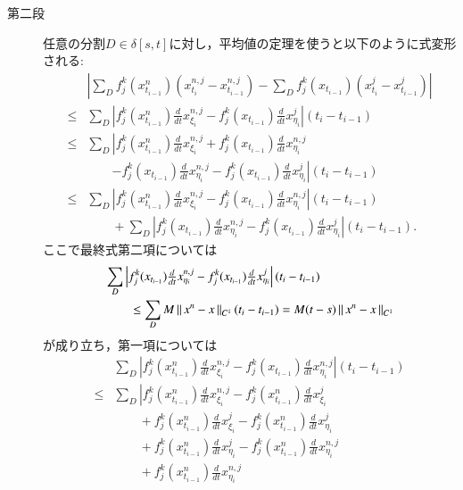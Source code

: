 \begin{prf}
\begin{description}
		\item[第二段]
			任意の分割$D \in \delta[s,t]$に対し，平均値の定理を使うと以下のように式変形される:
			\begin{align}
				&\left| \sum_D f^k_j(x^n_{t_{i-1}})(x^{n,j}_{t_i} - x^{n,j}_{t_{i-1}})
					- \sum_D f^k_j(x_{t_{i-1}})(x^j_{t_i} - x^j_{t_{i-1}}) \right| \\
				\leq &\sum_D \left| f^k_j(x^n_{t_{i-1}}) \tfrac{d}{dt}x^{n,j}_{\xi_i} 
					- f^k_j(x_{t_{i-1}}) \tfrac{d}{dt}x^j_{\eta_i} \right|(t_i - t_{i-1}) \\
				\leq &\sum_D \left| f^k_j(x^n_{t_{i-1}}) \tfrac{d}{dt}x^{n,j}_{\xi_i} 
					+ f^k_j(x_{t_{i-1}}) \tfrac{d}{dt}x^{n,j}_{\eta_i} \right.\\
					&\qquad \left.- f^k_j(x_{t_{i-1}}) \tfrac{d}{dt}x^{n,j}_{\eta_i}
					- f^k_j(x_{t_{i-1}}) \tfrac{d}{dt}x^j_{\eta_i} \right|(t_i - t_{i-1}) \\
				\leq &\sum_D \left| f^k_j(x^n_{t_{i-1}}) \tfrac{d}{dt}x^{n,j}_{\xi_i} 
					- f^k_j(x_{t_{i-1}}) \tfrac{d}{dt}x^{n,j}_{\eta_i} \right|(t_i - t_{i-1}) \\
					&\qquad + \sum_D \left|f^k_j(x_{t_{i-1}}) \tfrac{d}{dt}x^{n,j}_{\eta_i}
					- f^k_j(x_{t_{i-1}}) \tfrac{d}{dt}x^j_{\eta_i} \right|(t_i - t_{i-1}).
			\end{align}
			ここで最終式第二項については
			\begin{align}
				&\sum_D \left|f^k_j(x_{t_{i-1}}) \tfrac{d}{dt}x^{n,j}_{\eta_i}
					- f^k_j(x_{t_{i-1}}) \tfrac{d}{dt}x^j_{\eta_i} \right|(t_i - t_{i-1}) \\
				&\qquad \leq \sum_D M \left\|\, x^n - x\, \right\|_{C^1} (t_i - t_{i-1})
				= M (t - s) \left\|\, x^n - x\, \right\|_{C^1}
			\end{align}
			が成り立ち，第一項については
			\begin{align}
				&\sum_D \left| f^k_j(x^n_{t_{i-1}}) \tfrac{d}{dt}x^{n,j}_{\xi_i} 
					- f^k_j(x_{t_{i-1}}) \tfrac{d}{dt}x^{n,j}_{\eta_i} \right|(t_i - t_{i-1}) \\
				\leq &\sum_D \left| f^k_j(x^n_{t_{i-1}}) \tfrac{d}{dt}x^{n,j}_{\xi_i} 
					- f^k_j(x^n_{t_{i-1}}) \tfrac{d}{dt}x^{j}_{\xi_i} \right.\\
					&\qquad + f^k_j(x^n_{t_{i-1}}) \tfrac{d}{dt}x^{j}_{\xi_i}
					- f^k_j(x^n_{t_{i-1}}) \tfrac{d}{dt}x^{j}_{\eta_i} \\
					&\qquad + f^k_j(x^n_{t_{i-1}}) \tfrac{d}{dt}x^{j}_{\eta_i}
					- f^k_j(x^n_{t_{i-1}}) \tfrac{d}{dt}x^{n,j}_{\eta_i} \\
					&\qquad + f^k_j(x^n_{t_{i-1}}) \tfrac{d}{dt}x^{n,j}_{\eta_i}

\end{align}
\end{description}
\end{prf}
